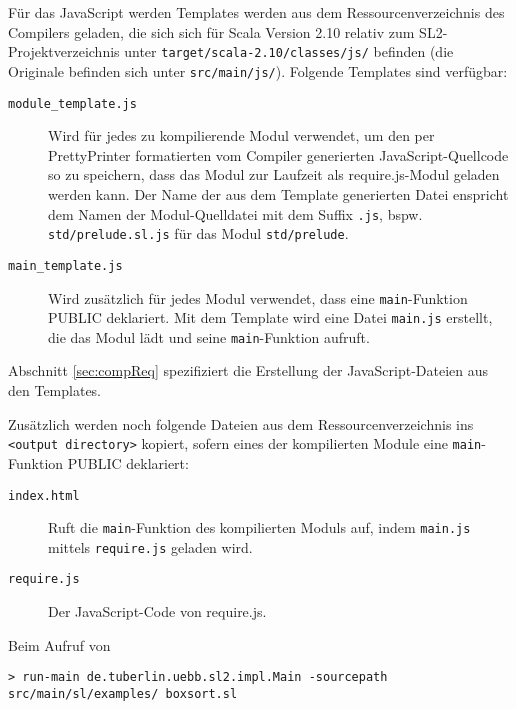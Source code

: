 \documentclass[runningheads]{llncs}
\begin{document}
\begin{description}
\begin{description}
        Für das JavaScript werden Templates werden aus dem
        Ressourcenverzeichnis des Compilers geladen, die sich sich für
        Scala Version 2.10 relativ zum SL2-Projektverzeichnis unter
        \texttt{target/scala-2.10/classes/js/} befinden (die Originale
        befinden sich unter \texttt{src/main/js/}). Folgende Templates
        sind verfügbar:
        
        \begin{description}
        \item[\texttt{module\_template.js}] Wird für jedes zu
            kompilierende Modul verwendet, um den per PrettyPrinter
            formatierten vom Compiler generierten JavaScript-Quellcode
            so zu speichern, dass das Modul zur Laufzeit als
            require.js-Modul geladen werden kann. Der Name der
            aus dem Template generierten Datei enspricht dem Namen
            der Modul-Quelldatei mit dem Suffix \texttt{.js}, bspw.
            \texttt{std/prelude.sl.js} für das Modul \texttt{std/prelude}.
        \item[\texttt{main\_template.js}] Wird zusätzlich für jedes
            Modul verwendet, dass eine \texttt{main}-Funktion PUBLIC deklariert.
            Mit dem Template wird eine Datei \texttt{main.js} erstellt,
            die das Modul lädt und seine \texttt{main}-Funktion aufruft.
        \end{description}
        
        Abschnitt \ref{sec:compReq} spezifiziert die Erstellung der
        JavaScript-Dateien aus den Templates.
                
        Zusätzlich werden noch folgende Dateien aus dem
        Ressourcenverzeichnis ins \texttt{<output directory>} kopiert,
        sofern eines der kompilierten Module eine \texttt{main}-Funktion
        PUBLIC deklariert:
        
        \begin{description}
        \item[\texttt{index.html}] Ruft die \texttt{main}-Funktion des
            kompilierten Moduls auf, indem \texttt{main.js} mittels
            \texttt{require.js} geladen wird.
        \item[\texttt{require.js}] Der JavaScript-Code von require.js.
        \end{description}
        
        Beim Aufruf von
         
\begin{verbatim}
> run-main de.tuberlin.uebb.sl2.impl.Main -sourcepath
src/main/sl/examples/ boxsort.sl
\end{verbatim}


\end{description}
\end{description}
\end{document}
